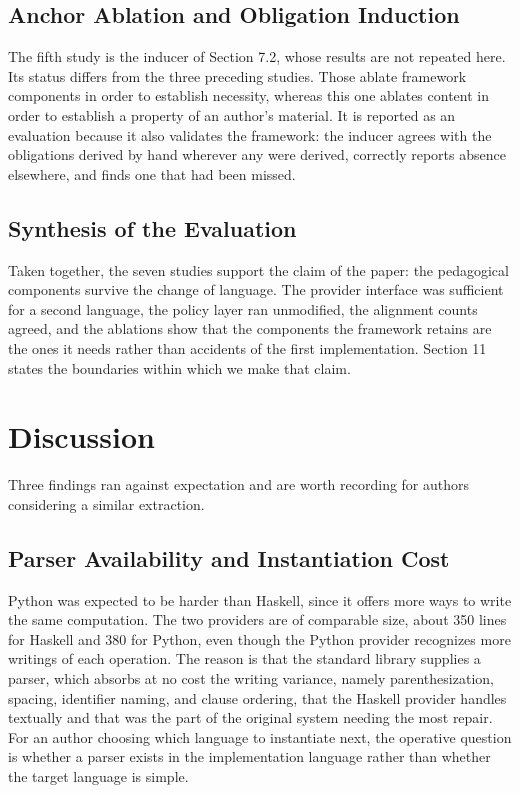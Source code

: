 \documentclass[10pt,twocolumn,letterpaper]{article}
\begin{document}
\subsection{Anchor Ablation and Obligation Induction}
The fifth study is the inducer of Section 7.2, whose results are not
repeated here. Its status differs from the three preceding studies.
Those ablate framework components in order to establish necessity,
whereas this one ablates content in order to establish a property of an
author's material. It is reported as an evaluation because it also
validates the framework: the inducer agrees with the obligations derived
by hand wherever any were derived, correctly reports absence elsewhere,
and finds one that had been missed.

\subsection{Synthesis of the Evaluation}
Taken together, the seven studies support the claim of the paper: the
pedagogical components survive the change of language. The provider
interface was sufficient for a second language, the policy layer ran
unmodified, the alignment counts agreed, and the ablations show that the
components the framework retains are the ones it needs rather than
accidents of the first implementation. Section 11 states the boundaries
within which we make that claim.

\section{Discussion}
Three findings ran against expectation and are worth recording for
authors considering a similar extraction.

\subsection{Parser Availability and Instantiation Cost}
Python was expected to be harder than Haskell, since it offers more ways
to write the same computation. The two providers are of comparable size,
about 350 lines for Haskell and 380 for Python, even though the Python
provider recognizes more writings of each operation. The reason is that
the standard library
supplies a parser, which absorbs at no cost the writing variance, namely
parenthesization, spacing, identifier naming, and clause ordering, that
the Haskell provider handles textually and that was the part of the
original system needing the most repair. For an author choosing which
language to instantiate next, the operative question is whether a parser
exists in the implementation language rather than whether the target
language is simple.
\end{document}
